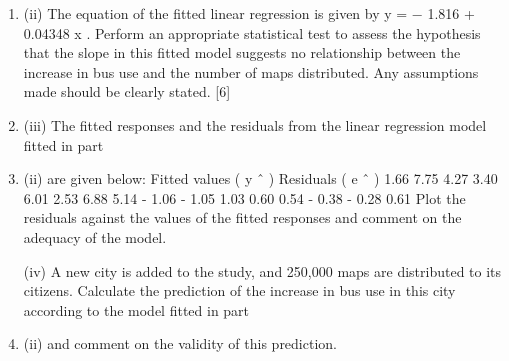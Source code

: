 \documentclass[a4paper,12pt]{article}
\begin{document}
\begin{enumerate}
\item (ii) The equation of the fitted linear regression is given by y = − 1.816 + 0.04348 x .
Perform an appropriate statistical test to assess the hypothesis that the slope in this fitted model suggests no relationship between the increase in bus use and the number of maps distributed. Any assumptions made should be clearly
stated.
[6]
\item (iii) The fitted responses and the residuals from the linear regression model fitted
in part \item (ii) are given below:
Fitted values ( y ˆ )
Residuals ( e ˆ )
1.66 7.75 4.27 3.40 6.01 2.53 6.88 5.14
- 1.06 - 1.05 1.03 0.60 0.54 - 0.38 - 0.28 0.61
Plot the residuals against the values of the fitted responses and comment on
the adequacy of the model.

(iv)
A new city is added to the study, and 250,000 maps are distributed to its
citizens.
Calculate the prediction of the increase in bus use in this city according to the model fitted in part \item (ii) and comment on the validity of this prediction.




\end{enumerate}
\end{document}
